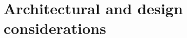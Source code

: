 \begin{comment}
            \item Make the \texttt{Interval} class we have seen in the first homework of DEV3 generic with respect to the type of the parameters \texttt{l} and \texttt{u}; specifically, build a generic class \texttt{Interval<N>} which takes as input two \texttt{N}'s \texttt{l} and \texttt{u}, and also an instance of \texttt{Number<N>}
        \end{itemize}
    \section{Exercise 2 - \small based on Chapter \ref{chapter: Reuse through polymorphism}}
	     \begin{myprop}
         \begin{itemize}
         	\item Write an \texttt{IAction<T>} parametric interface with a method \texttt{Invoke} that takes no arguments number and returns an object belonging to the type of the \texttt{T} (the parameter of the interface)
         	\item Write a \texttt{When} class that implements \texttt{IStateMachine}; A \texttt{When} takes an \texttt{IAction} of type \texttt{bool} (\texttt{IAction<bool>}) when instantiated and at every update it tries to invoke the given \texttt{IAction} and only if it returns \texttt{true} then set \texttt{Done} to \texttt{true}
         	\item Test your program with the following code \texttt{new Sequence(new When(}\\ \texttt{myRandom), new Run(new Print("Hello World")))}. Make sure that it prints "Hello World" after a random time. For this homework use MonoGame so to get the elapsed time for each update call. \texttt{myRandom} is an instance of the following class:
\begin{lstlisting}         	
pulic class MyRandom : IAction<bool>{
  Random seed = new System.Random();
  public bool Invoke(){ 
    return seed.Random().Next(10) > 7; 
  }
}
\end{lstlisting}
		\end{itemize}
	     \end{myprop}
         	
\end{comment}


\chapter{Architectural and design considerations}
